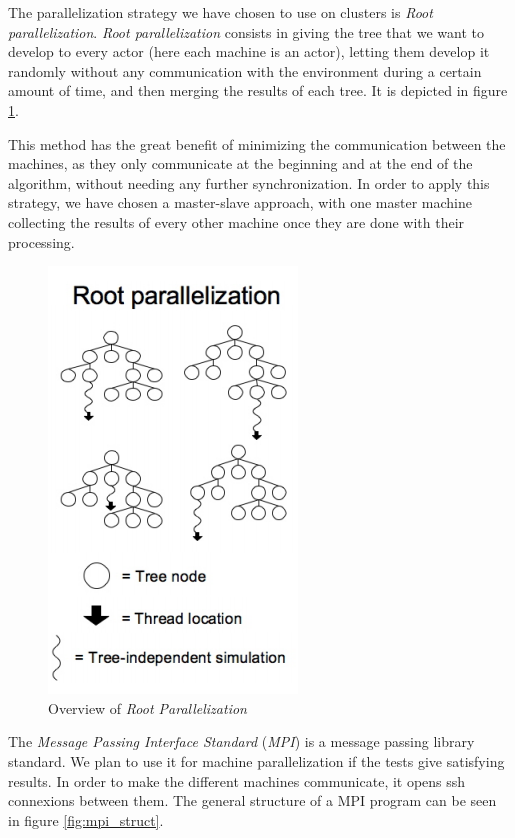 The parallelization strategy we have chosen to use on clusters is \emph{Root parallelization}.
\emph{Root parallelization} consists in giving the tree that we want to develop to every actor (here each machine is an actor), letting them develop it randomly without any communication with the environment during a certain amount of time, and then merging the results of each tree.
It is depicted in figure \ref{fig:root}.

This method has the great benefit of minimizing the communication between the machines, as they only communicate at the beginning and at the end of the algorithm, without needing any further synchronization.
In order to apply this strategy, we have chosen a master-slave approach, with one master machine collecting the results of every other machine once they are done with their processing.

\begin{figure}[!ht] 
\centerline{\includegraphics[scale=0.5]{Parallelisation/Strategy/Img/root.png}}
   \caption{Overview of \emph{Root Parallelization} \cite{parallel_comp}}
\label{fig:root}
\end{figure}

The \emph{Message Passing Interface Standard} (\emph{MPI}) is a message passing library standard.
We plan to use it for machine parallelization if the tests give satisfying results.
In order to make the different machines communicate, it opens ssh connexions between them.
The general structure of a MPI program can be seen in figure \ref{fig:mpi_struct}.

